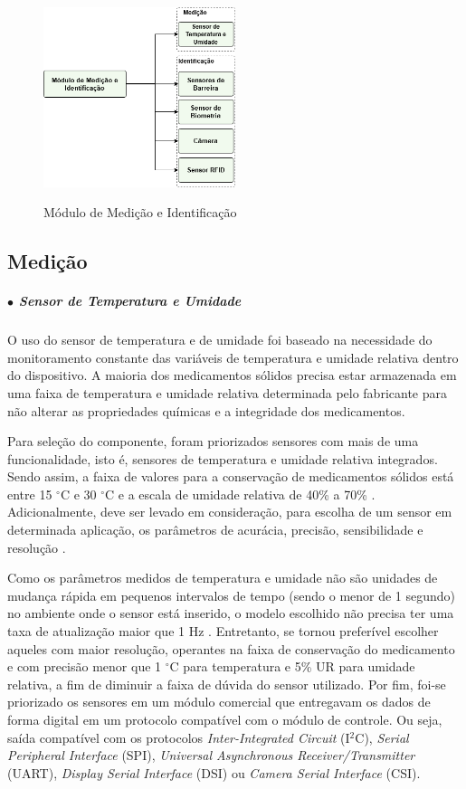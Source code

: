 \begin{figure}[H]
    \centering
    {\includegraphics[width=0.5\textwidth]{figuras/eletronica/esquematicos/m_medicao.png}}
    \caption{Módulo de Medição e Identificação} 
    \label{fig:modulo_medicao}
\end{figure}


\subsection{Medição}
    \subparagraph*{$\bullet$ Sensor de Temperatura e Umidade} \hfill
    
     O uso do sensor de temperatura e de umidade foi baseado na necessidade do monitoramento constante das variáveis de temperatura e umidade relativa dentro do dispositivo. A maioria dos medicamentos sólidos precisa estar armazenada em uma faixa de temperatura e umidade relativa determinada pelo fabricante para não alterar as propriedades químicas e a integridade dos medicamentos. 
    
    Para seleção do componente, foram priorizados sensores com mais de uma funcionalidade, isto é, sensores de temperatura e umidade relativa integrados. Sendo assim, a faixa de valores para a conservação de medicamentos sólidos está entre 15 $^\circ$C e 30 $^\circ$C e a escala de umidade relativa de 40\% a 70\% \cite{Pinto_2016}. Adicionalmente, deve ser levado em consideração, para escolha de um sensor em determinada aplicação, os parâmetros de acurácia, precisão, sensibilidade e resolução \cite{webster2018measurement}. 
    
    Como os parâmetros medidos de temperatura e umidade não são unidades de mudança rápida em pequenos intervalos de tempo (sendo o menor de 1 segundo) no ambiente onde o sensor está inserido, o modelo escolhido não precisa ter uma taxa de atualização maior que 1 Hz \cite{webster2018measurement}. Entretanto, se tornou preferível escolher aqueles com maior resolução, operantes na faixa de conservação do medicamento e com precisão menor que 1 $^\circ$C para temperatura e 5\% UR para umidade relativa, a fim de diminuir a faixa de dúvida do sensor utilizado. Por fim, foi-se priorizado os sensores em um módulo comercial que entregavam os dados de forma digital em um protocolo compatível com o módulo de controle. Ou seja, saída compatível com os protocolos \textit{Inter-Integrated Circuit} (I$^2$C), \textit{Serial Peripheral Interface} (SPI), \textit{Universal Asynchronous Receiver/Transmitter} (UART), \textit{Display Serial Interface} (DSI) ou \textit{Camera Serial Interface} (CSI).
    
